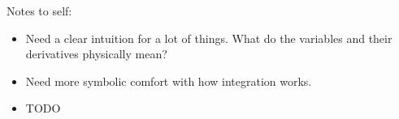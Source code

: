 \documentclass[11pt, oneside]{article}   	%
\begin{document}
Notes to self:
\begin{itemize}
\item Need a clear intuition for a lot of things.  What do the variables and their derivatives physically mean?
\item Need more symbolic comfort with how integration works.
\end{itemize}



\begin{itemize}
\item  TODO
\end{itemize}
\end{document}
